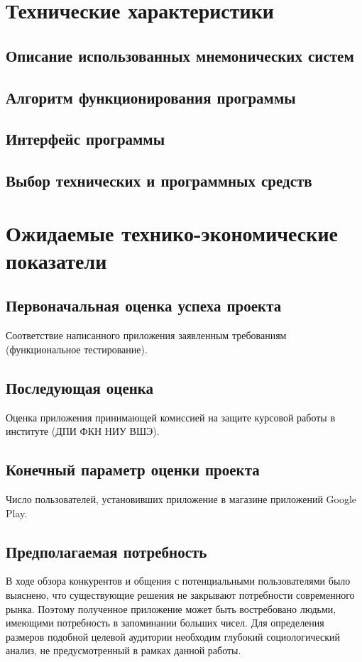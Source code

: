 \documentclass[draft]{article}
\begin{document}
\section{Технические характеристики}
\subsection{Описание использованных мнемонических систем}
\subsection{Алгоритм функционирования программы}
\subsection{Интерфейс программы}
\subsection{Выбор технических и программных средств}
\newpage
\section{Ожидаемые технико-экономические показатели}
\subsection{Первоначальная оценка успеха проекта}
Соответствие написанного приложения заявленным требованиям (функциональное тестирование).
\subsection{Последующая оценка}
Оценка приложения принимающей комиссией на защите курсовой работы в институте (ДПИ ФКН НИУ ВШЭ).
\subsection{Конечный параметр оценки проекта}
Число пользователей, установивших приложение в магазине приложений Google Play.\\
\subsection{Предполагаемая потребность}
В ходе обзора конкурентов и общения с потенциальными пользователями было выяснено, что существующие решения не закрывают потребности современного рынка. Поэтому полученное приложение может быть востребовано людьми, имеющими потребность в запоминании больших чисел. Для определения размеров подобной целевой аудитории необходим глубокий социологический анализ, не предусмотренный в рамках данной работы.
\end{document}
